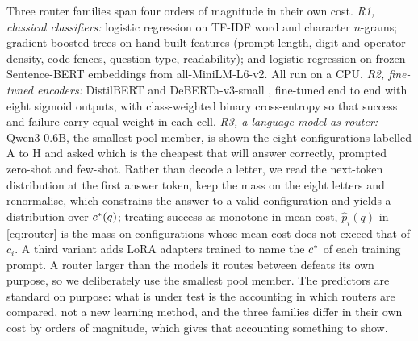 Three router families span four orders of magnitude in their own cost.
\emph{R1, classical classifiers:} logistic regression on TF-IDF word and
character $n$-grams; gradient-boosted trees
\cite{chen2016xgboost,ke2017lightgbm} on hand-built features (prompt length,
digit and operator density, code fences, question type, readability); and
logistic regression on frozen Sentence-BERT embeddings
\cite{reimers2019sbert} from all-MiniLM-L6-v2. All run
on a CPU. \emph{R2, fine-tuned encoders:} DistilBERT \cite{sanh2019distilbert}
and DeBERTa-v3-small \cite{he2023debertav3}, fine-tuned end to
end with eight sigmoid outputs, with class-weighted binary cross-entropy so
that success and failure carry equal weight in each cell. \emph{R3, a
language model as router:} Qwen3-0.6B, the smallest pool member, is shown the
eight configurations labelled A to H and asked which is the cheapest that
will answer correctly, prompted zero-shot and few-shot. Rather than decode a
letter, we read the next-token distribution at the first answer token, keep
the mass on the eight letters and renormalise, which constrains the answer to
a valid configuration and yields a distribution over $c^{*}(q)$; treating
success as monotone in mean cost, $\hat{p}_i(q)$ in \eqref{eq:router} is the
mass on configurations whose mean cost does not exceed that of $c_i$. A third
variant adds LoRA adapters \cite{hu2022lora} trained to name the $c^{*}$ of
each training prompt. A router larger than the models it routes between
defeats its own purpose, so we deliberately use the smallest pool member. The
predictors are standard on purpose: what is under test is the accounting in
which routers are compared, not a new learning method, and the three families
differ in their own cost by orders of magnitude, which gives that accounting
something to show.

